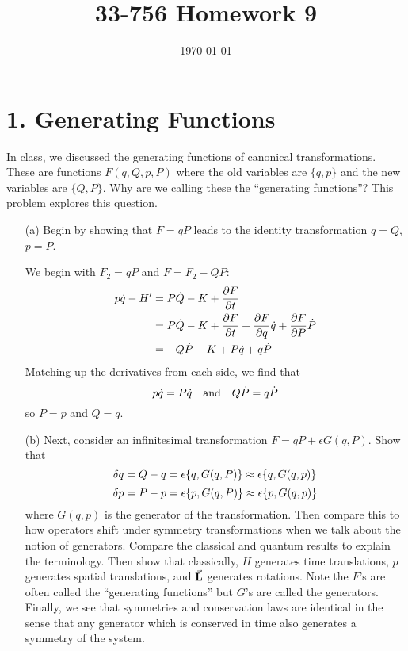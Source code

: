 \documentclass[a4paper,twoside]{article}
\title{33-756 Homework 9}
\date{\today}
\begin{document}
\maketitle
\section*{1. Generating Functions}
In class, we discussed the generating functions of canonical transformations. These are functions $ F(q, Q, p, P) $ where the old variables are $ \{q,p\} $ and the new variables are $ \{Q, P\} $. Why are we calling these the ``generating functions''? This problem explores this question.
\begin{itemize}
    \item[(a)] Begin by showing that $ F = qP $ leads to the identity transformation $ q = Q $, $ p = P $.
        \begin{problem}
            We begin with $ F_2 = qP $ and $ F = F_2 - QP $:
            \begin{align}
                p\dot{q} - H' &= P\dot{Q} - K + \pdv{F}{t} \\
                &= P\dot{Q} - K + \pdv{F}{t} + \pdv{F}{q}\dot{q} + \pdv{F}{P}\dot{P} \\
                &= -Q\dot{P} - K + P\dot{q} + q\dot{P}
            \end{align}
            Matching up the derivatives from each side, we find that
            \begin{equation}
                p\dot{q} = P\dot{q} \qand Q\dot{P} = q\dot{P}
            \end{equation}
            so $ P = p $ and $ Q = q $.
        \end{problem}
    \item[(b)] Next, consider an infinitesimal transformation $ F = qP + \epsilon G(q,P) $. Show that
        \begin{equation}
            \delta q = Q - q = \epsilon \pb{q}{G(q,P)} \approx \epsilon \pb{q}{G(q,p)} 
        \end{equation}
        \begin{equation}
            \delta p = P - p = \epsilon \pb{p}{G(q,P)} \approx \epsilon \pb{p}{G(q,p)}
        \end{equation}
        where $ G(q,p) $ is the generator of the transformation. Then compare this to how operators shift under symmetry transformations when we talk about the notion of generators. Compare the classical and quantum results to explain the terminology. Then show that classically, $ H $ generates time translations, $ p $ generates spatial translations, and $ \va{L} $ generates rotations. Note the $ F $'s are often called the ``generating functions'' but $ G $'s are called the generators. Finally, we see that symmetries and conservation laws are identical in the sense that any generator which is conserved in time also generates a symmetry of the system.

\end{itemize}
\end{document}
